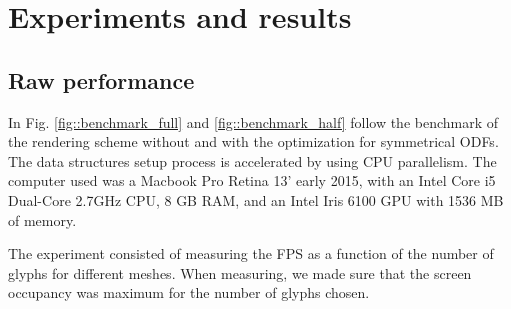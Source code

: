 \documentclass[twoside,twocolumn,10pt]{article}
\begin{document}





\section{Experiments and results}
\label{sec::results}




\subsection{Raw performance}

In Fig. \ref{fig::benchmark_full} and \ref{fig::benchmark_half} follow the benchmark of the rendering scheme without and with the optimization for symmetrical ODFs. The data structures setup process is accelerated by using CPU parallelism. The computer used was a Macbook Pro Retina 13' early 2015, with an Intel Core i5 Dual-Core 2.7GHz CPU, 8 GB RAM, and an Intel Iris 6100 GPU with 1536 MB of memory.

The experiment consisted of measuring the FPS as a function of the number of glyphs for different meshes. When measuring, we made sure that the screen occupancy was maximum for the number of glyphs chosen.
\end{document}
